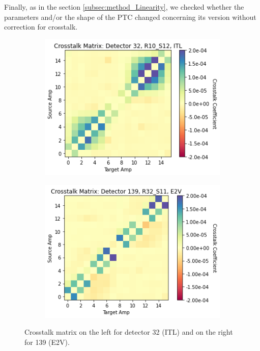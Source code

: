 Finally, as in the section \ref{subsec:method_Linearity}, we checked whether the parameters and/or the shape of the PTC changed concerning its version without correction for crosstalk.


\begin{figure}[!htb]
     \centering
     \begin{subfigure}[b]{0.49\textwidth}
         \centering
         \includegraphics[width=\textwidth]{Figures/Crosstalk_32.png}
     \end{subfigure}
     \hfill
     \begin{subfigure}[b]{0.49\textwidth}
         \centering
         \includegraphics[width=\textwidth]{Figures/Crosstalk_139.png}
     \end{subfigure}
        \caption{Crosstalk matrix on the left for detector 32 (ITL) and on the right for 139 (E2V).}
        \label{fig:crosstalk_matrix}
\end{figure}